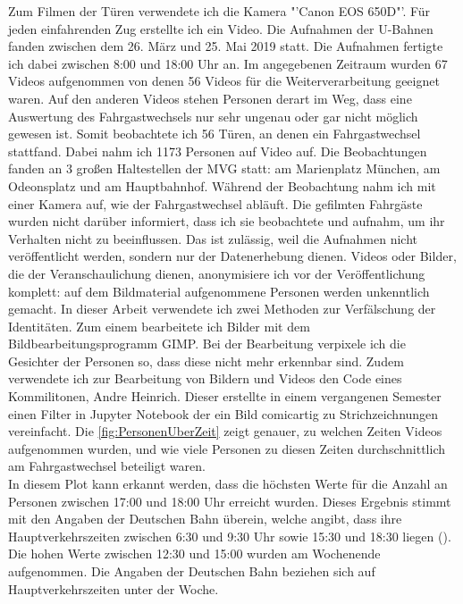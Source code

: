 Zum Filmen der Türen verwendete ich die Kamera "'Canon EOS 650D"'. Für jeden einfahrenden Zug erstellte ich ein Video. Die Aufnahmen der U-Bahnen fanden zwischen dem 26. März und 25. Mai 2019 statt. Die Aufnahmen fertigte ich dabei zwischen 8:00 und 18:00 Uhr an. Im angegebenen Zeitraum wurden 67 Videos aufgenommen von denen 56 Videos für die Weiterverarbeitung geeignet waren. Auf den anderen Videos stehen Personen derart im Weg, dass eine Auswertung des Fahrgastwechsels nur sehr ungenau oder gar nicht möglich gewesen ist. Somit beobachtete ich 56 Türen, an denen ein Fahrgastwechsel stattfand. Dabei nahm ich 1173 Personen auf Video auf. Die Beobachtungen fanden an 3 großen Haltestellen der MVG statt: am Marienplatz München, am Odeonsplatz und am Hauptbahnhof. Während der Beobachtung nahm ich mit einer Kamera auf, wie der Fahrgastwechsel abläuft. Die gefilmten Fahrgäste wurden nicht darüber informiert, dass ich sie beobachtete und aufnahm, um ihr Verhalten nicht zu beeinflussen. Das ist zulässig, weil die Aufnahmen nicht veröffentlicht werden, sondern nur der Datenerhebung dienen. Videos oder Bilder, die der Veranschaulichung dienen, anonymisiere ich vor der Veröffentlichung komplett: auf dem Bildmaterial aufgenommene Personen werden unkenntlich gemacht. In dieser Arbeit verwendete ich zwei Methoden zur Verfälschung der Identitäten. Zum einem bearbeitete ich Bilder mit dem Bildbearbeitungsprogramm \textsf{GIMP}. Bei der Bearbeitung verpixele ich die Gesichter der Personen so, dass diese nicht mehr erkennbar sind. Zudem verwendete ich zur Bearbeitung von Bildern und Videos den Code eines Kommilitonen, Andre Heinrich. Dieser erstellte in einem vergangenen Semester einen Filter in \textsf{Jupyter Notebook} der ein Bild comicartig zu Strichzeichnungen vereinfacht.
Die \figurename \ref{fig:PersonenUberZeit} zeigt genauer, zu welchen Zeiten Videos aufgenommen wurden, und wie viele Personen zu diesen Zeiten durchschnittlich am Fahrgastwechsel beteiligt waren.\\
In diesem Plot kann erkannt werden, dass die höchsten Werte für die Anzahl an Personen zwischen 17:00 und 18:00 Uhr erreicht wurden. Dieses Ergebnis stimmt mit den Angaben der Deutschen Bahn überein, welche angibt, dass ihre Hauptverkehrszeiten zwischen 6:30 und 9:30 Uhr sowie 15:30 und 18:30 liegen (\cite{DeutscheBahnAG.2018}). Die hohen Werte zwischen 12:30 und 15:00 wurden am Wochenende aufgenommen. Die Angaben der Deutschen Bahn beziehen sich auf Hauptverkehrszeiten unter der Woche.
